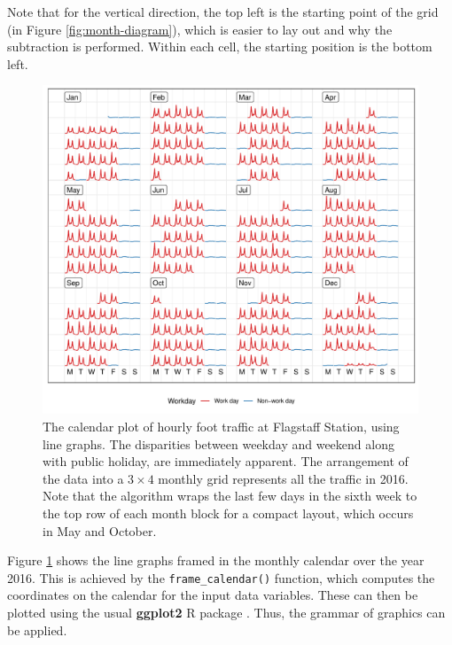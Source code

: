 \documentclass[12pt]{article}
\begin{document}
Note that for the vertical direction, the top left is the starting point of the grid (in Figure \ref{fig:month-diagram}), which is easier to lay out and why the subtraction is performed. Within each cell, the starting position is the bottom left.

\begin{figure}

{\centering \includegraphics[width=\textwidth]{figure/fs-2016-1} 

}

\caption{The calendar plot of hourly foot traffic at Flagstaff Station, using line graphs. The disparities between weekday and weekend along with public holiday, are immediately apparent. The arrangement of the data into a \(3 \times 4\) monthly grid represents all the traffic in 2016. Note that the algorithm wraps the last few days in the sixth week to the top row of each month block for a compact layout, which occurs in May and October.}\label{fig:fs-2016}
\end{figure}



Figure \ref{fig:fs-2016} shows the line graphs framed in the monthly calendar over the year 2016. This is achieved by the \texttt{frame\_calendar()} function, which computes the coordinates on the calendar for the input data variables. These can then be plotted using the usual \textbf{ggplot2} R package \citep{R-ggplot2}. Thus, the grammar of graphics can be applied.
\end{document}
